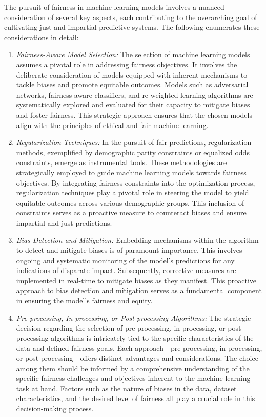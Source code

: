 The pursuit of fairness in machine learning models involves a nuanced consideration of several key aspects, each contributing to the overarching goal of cultivating just and impartial predictive systems. The following enumerates these considerations in detail:

\begin{enumerate}
    
    \item \emph{Fairness-Aware Model Selection:} The selection of machine learning models assumes a pivotal role in addressing fairness objectives. It involves the deliberate consideration of models equipped with inherent mechanisms to tackle biases and promote equitable outcomes. Models such as adversarial networks, fairness-aware classifiers, and re-weighted learning algorithms are systematically explored and evaluated for their capacity to mitigate biases and foster fairness. This strategic approach ensures that the chosen models align with the principles of ethical and fair machine learning.

    \item \emph{Regularization Techniques:} In the pursuit of fair predictions, regularization methods, exemplified by demographic parity constraints or equalized odds constraints, emerge as instrumental tools. These methodologies are strategically employed to guide machine learning models towards fairness objectives. By integrating fairness constraints into the optimization process, regularization techniques play a pivotal role in steering the model to yield equitable outcomes across various demographic groups. This inclusion of constraints serves as a proactive measure to counteract biases and ensure impartial and just predictions.

    \item \emph{Bias Detection and Mitigation:} Embedding mechanisms within the algorithm to detect and mitigate biases is of paramount importance. This involves ongoing and systematic monitoring of the model's predictions for any indications of disparate impact. Subsequently, corrective measures are implemented in real-time to mitigate biases as they manifest. This proactive approach to bias detection and mitigation serves as a fundamental component in ensuring the model's fairness and equity.

    \item \emph{Pre-processing, In-processing, or Post-processing Algorithms:} The strategic decision regarding the selection of pre-processing, in-processing, or post-processing algorithms is intricately tied to the specific characteristics of the data and defined fairness goals. Each approach—pre-processing, in-processing, or post-processing—offers distinct advantages and considerations. The choice among them should be informed by a comprehensive understanding of the specific fairness challenges and objectives inherent to the machine learning task at hand. Factors such as the nature of biases in the data, dataset characteristics, and the desired level of fairness all play a crucial role in this decision-making process.

\end{enumerate}

